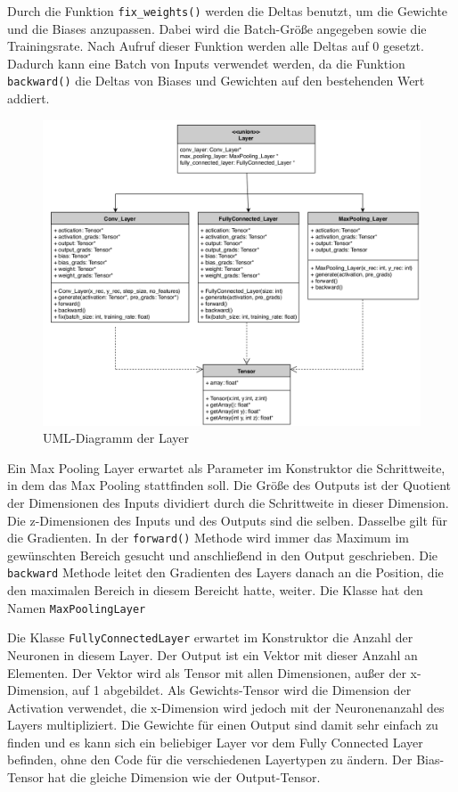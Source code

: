 \documentclass[../main.tex]{subfiles}
\begin{document}
Durch die Funktion \texttt{fix\_weights()} werden die Deltas benutzt, um die Gewichte und die Biases anzupassen. Dabei wird die Batch-Größe angegeben sowie die Trainingsrate. Nach Aufruf dieser Funktion werden alle Deltas auf 0 gesetzt. Dadurch kann eine Batch von Inputs verwendet werden, da die Funktion \texttt{backward()} die Deltas von Biases und Gewichten auf den bestehenden Wert addiert.

\begin{figure}[!htbp]
	\centering
	\includegraphics[width=\textwidth]{../images/Benz/UML_Layer.png}
	\caption{UML-Diagramm der Layer} 
	\label{fig:uml_layer}
\end{figure}

Ein Max Pooling Layer erwartet als Parameter im Konstruktor die Schrittweite, in dem das Max Pooling stattfinden soll. Die Größe des Outputs ist der Quotient der Dimensionen des Inputs dividiert durch die Schrittweite in dieser Dimension. Die z-Dimensionen des Inputs und des Outputs sind die selben. Dasselbe gilt für die Gradienten. In der \texttt{forward()} Methode wird immer das Maximum im gewünschten Bereich gesucht und anschließend in den Output geschrieben. Die \texttt{backward} Methode leitet den Gradienten des Layers danach an die Position, die den maximalen Bereich in diesem Bereicht hatte, weiter. Die Klasse hat den Namen \texttt{MaxPoolingLayer}

Die Klasse \texttt{FullyConnectedLayer} erwartet im Konstruktor die Anzahl der Neuronen in diesem Layer. Der Output ist ein Vektor mit dieser Anzahl an Elementen. Der Vektor wird als Tensor mit allen Dimensionen, außer der x-Dimension, auf 1 abgebildet. Als Gewichts-Tensor wird die Dimension der Activation verwendet, die x-Dimension wird jedoch mit der Neuronenanzahl des Layers multipliziert. Die Gewichte für einen Output sind damit sehr einfach zu finden und es kann sich ein beliebiger Layer vor dem Fully Connected Layer befinden, ohne den Code für die verschiedenen Layertypen zu ändern. Der Bias-Tensor hat die gleiche Dimension wie der Output-Tensor.
\end{document}
